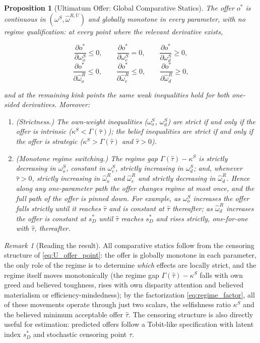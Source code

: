 \documentclass[11pt]{article}
\theoremstyle{plain}
\newtheorem{proposition}{Proposition}
\theoremstyle{remark}
\newtheorem{remark}{Remark}
\begin{document}
\begin{proposition}[Ultimatum Offer: Global Comparative Statics]
\label{prop:ug_cs}
The offer $o^\ast$ is continuous in $(\omega^S,\hat\omega^{R,U})$ and \emph{globally} monotone in every parameter, with no regime qualification: at every point where the relevant derivative exists,
\begin{csbox}
\[
        \frac{\partial o^\ast}{\partial \omega_o^S}\le0,
        \qquad
        \frac{\partial o^\ast}{\partial \omega_e^S}=0,
        \qquad
        \frac{\partial o^\ast}{\partial \omega_d^S}\ge0,
\]
\[
        \frac{\partial o^\ast}{\partial \hat\omega_o^{R}}\le0,
        \qquad
        \frac{\partial o^\ast}{\partial \hat\omega_e^{R}}\le0,
        \qquad
        \frac{\partial o^\ast}{\partial \hat\omega_d^{R}}\ge0,
\]
\end{csbox}
and at the remaining kink points the same weak inequalities hold for both one-sided derivatives.  Moreover:
\begin{enumerate}[topsep=2pt,itemsep=2pt]
\item \emph{(Strictness.)}  The own-weight inequalities ($\omega_o^S$, $\omega_d^S$) are strict if and only if the offer is intrinsic ($\kappa^S<\Gamma(\hat\tau)$); the belief inequalities are strict if and only if the offer is strategic ($\kappa^S>\Gamma(\hat\tau)$ and $\hat\tau>0$).
\item \emph{(Monotone regime switching.)}  The regime gap $\Gamma(\hat\tau)-\kappa^S$ is strictly decreasing in $\omega_o^S$, constant in $\omega_e^S$, strictly increasing in $\omega_d^S$; and, whenever $\hat\tau>0$, strictly increasing in $\hat\omega_o^{R}$ and $\hat\omega_e^{R}$ and strictly decreasing in $\hat\omega_d^{R}$.  Hence along any one-parameter path the offer changes regime at most once, and the full path of the offer is pinned down.  For example, as $\omega_o^S$ increases the offer falls strictly until it reaches $\hat\tau$ and is constant at $\hat\tau$ thereafter; as $\hat\omega_d^{R}$ increases the offer is constant at $s_D^\ast$ until $\hat\tau$ reaches $s_D^\ast$ and rises strictly, one-for-one with $\hat\tau$, thereafter.
\end{enumerate}
\end{proposition}

\begin{remark}[Reading the result]
All comparative statics follow from the censoring structure of \eqref{eq:U_offer_point}: the offer is globally monotone in each parameter, the only role of the regime is to determine \emph{which} effects are locally strict, and the regime itself moves monotonically (the regime gap $\Gamma(\hat\tau)-\kappa^S$ falls with own greed and believed toughness, rises with own disparity attention and believed materialism or efficiency-mindedness); by the factorization \eqref{eq:regime_factor}, all of these movements operate through just two scalars, the selfishness ratio $\kappa^S$ and the believed minimum acceptable offer $\hat\tau$.  The censoring structure is also directly useful for estimation: predicted offers follow a Tobit-like specification with latent index $s_D^\ast$ and stochastic censoring point $\hat\tau$.
\end{remark}
\end{document}
